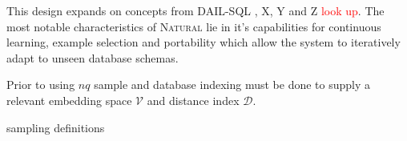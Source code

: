 This design expands on concepts from DAIL-SQL \citep{DAIL}, X, Y and Z \textcolor{red}{look up}.
The most notable characteristics of \textsc{Natural} lie in it's capabilities for continuous
learning, example selection and portability which allow the system to iteratively
adapt to unseen database schemas.

Prior to using $nq$ sample and database indexing must be done to supply a relevant 
embedding space $\mathcal{V}$ and distance index $\mathcal{D}$.

{sampling}
{definitions}


